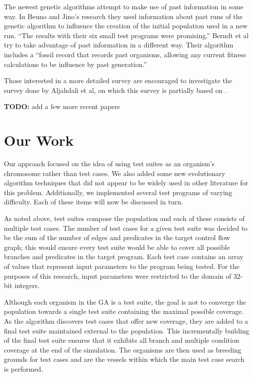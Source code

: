 \documentclass[runningheads]{llncs}
\begin{document}
The newest genetic algorithms attempt to make use of past information in some way. In Beuno and Jino's research they used information about past runs of the genetic algorithm to influence the creation of the initial population used in a new run\cite{limits6}. ``The results with their six small test programs were promising.''\cite{limits6} Berndt et al try to take advantage of past information in a different way. Their algorithm includes a ``fossil record that records past organisms, allowing any current fitness calculations to be influence by past generation.''\cite{limits6}

Those interested in a more detailed survey are encouraged to investigate the survey done by Aljahdali et al, on which this survey is partially based on \cite{limits6}.

\textbf{TODO:} add a few more recent papers




\newpage
\section{Our Work}
Our approach focused on the idea of using test suites as an organism's chromosome rather than test cases. We also added some new evolutionary algorithm techniques that did not appear to be widely used in other literature for this problem. Additionally, we implemented several test programs of varying difficulty. Each of these items will now be discussed in turn.

As noted above, test suites compose the population and each of these consists of multiple test cases. The number of test cases for a given test suite was decided to be the sum of the number of edges and predicates in the target control flow graph; this would ensure every test suite would be able to cover all possible branches and predicates in the target program. Each test case contains an array of values that represent input parameters to the program being tested. For the purposes of this research, input parameters were restricted to the domain of 32-bit integers.

Although each organism in the GA is a test suite, the goal is not to converge the population towards a single test suite containing the maximal possible coverage. As the algorithm discovers test cases that offer new coverage, they are added to a final test suite maintained external to the population. This incrementally building of the final test suite ensures that it exhibits all branch and multiple condition coverage at the end of the simulation. The organisms are then used as breeding grounds for test cases and are the vessels within which the main test case search is performed.
\end{document}
